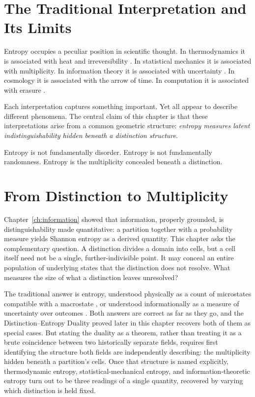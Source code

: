 \documentclass[12pt,twoside,openright]{book}
\begin{document}
\section{The Traditional Interpretation and Its Limits}
\label{sec:ch3-trad}

Entropy occupies a peculiar position in scientific
thought. In thermodynamics it is associated with heat
and irreversibility \parencite{boltzmann1877,gibbs1902}.
In statistical mechanics it is associated with
multiplicity. In information theory it is associated with
uncertainty \parencite{jaynes1957}. In cosmology it is
associated with the arrow of time. In computation it is
associated with erasure \parencite{landauer1961irreversibility}.

Each interpretation captures something important. Yet all
appear to describe different phenomena. The central claim
of this chapter is that these interpretations arise from
a common geometric structure: \emph{entropy measures
latent indistinguishability hidden beneath a distinction
structure}.

Entropy is not fundamentally disorder. Entropy is not
fundamentally randomness. Entropy is the multiplicity
concealed beneath a distinction.

\section{From Distinction to Multiplicity}
\label{sec:ch3-from-distinction}

Chapter~\ref{ch:information} showed that information,
properly grounded, is distinguishability made quantitative:
a partition together with a probability measure yields
Shannon entropy as a derived quantity. This chapter asks the
complementary question. A distinction divides a domain into
cells, but a cell itself need not be a single,
further-indivisible point. It may conceal an entire
population of underlying states that the distinction does
not resolve. What measures the size of what a distinction
leaves unresolved?

The traditional answer is entropy, understood physically as
a count of microstates compatible with a macrostate
\parencite{boltzmann1877,gibbs1902}, or understood
informationally as a measure of uncertainty over outcomes
\parencite{jaynes1957}. Both answers are correct as far as
they go, and the Distinction--Entropy Duality proved later
in this chapter recovers both of them as special cases. But
stating the duality as a theorem, rather than treating it as
a brute coincidence between two historically separate
fields, requires first identifying the structure both fields
are independently describing: the multiplicity hidden
beneath a partition's cells. Once that structure is named
explicitly, thermodynamic entropy, statistical-mechanical
entropy, and information-theoretic entropy turn out to be
three readings of a single quantity, recovered by varying
which distinction is held fixed.
\end{document}
